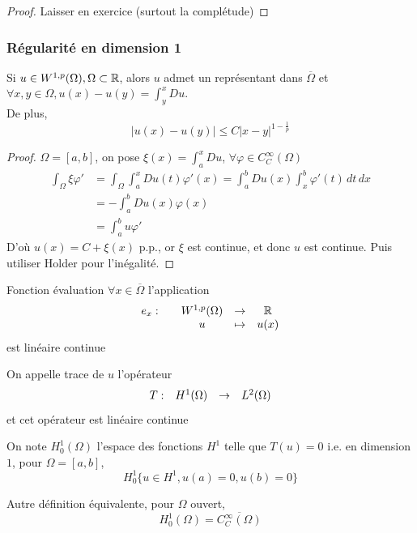 \documentclass[]{report}
\begin{document}
    \begin{proof}
        Laisser en exercice (surtout la complétude)
    \end{proof}

    \subsubsection*{Régularité en dimension 1}

    \begin{tm}{}{}
        Si $u\in W^{1,p}(\Omega),\Omega\subset \mathbb{R}$, alors $u$ admet un représentant dans $\overline{\Omega}$ et $\forall x,y\in \Omega,u(x)-u(y)=\int_y^x Du$.\\
        De plus, 
        \[\left|u(x)-u(y)\right|\le C\left|x-y\right|^{1-\frac{1}{p}}\]
    \end{tm}

    \begin{proof}
        $\Omega=[a,b]$, on pose $\xi(x)=\int_a^x Du$, $\forall \varphi\in C_C^\infty(\Omega)$
        \begin{align*}
            \int_\Omega \xi \varphi'&=\int_\Omega\int_a^x Du(t)\varphi'(x)=\int_a^b Du(x)\int_x^b\varphi'(t)\, dt\, dx\\
            &=-\int_a^b Du(x)\varphi(x)\\
            &=\int_a^b u\varphi'
        \end{align*}
        D'où $u(x)=C+\xi(x)$ p.p., or $\xi $ est continue, et donc $u$ est continue. Puis utiliser Holder pour l'inégalité.
    \end{proof}

    \begin{tm}{Fonction évaluation}{}
        $\forall x\in \overline{\Omega}$ l'application
        \[\begin{array}{ccccc} e_x : & & W^{1,p}(\Omega) & \to & \mathbb{R} \\ & & u & \mapsto & u(x) \end{array}\]
        est linéaire continue
    \end{tm}

    \begin{df}{}{}
        On appelle trace de $u$ l'opérateur
        \[\begin{array}{ccccc} T : & H^1(\Omega) & \to & L^2(\Omega) \end{array}\]
        et cet opérateur est linéaire continue
    \end{df}

    \begin{df}{}{}
        On note $H_0^1(\Omega)$ l'espace des fonctions $H^1$ telle que $T(u)=0$ i.e. en dimension $1$, pour $\Omega=[a,b]$,
        \[H_0^1\{u\in H^1,u(a)=0,u(b)=0\}\]
    \end{df}

    \begin{re}{}{}
        Autre définition équivalente, pour $\Omega$ ouvert,
        \[H_0^1(\Omega)=\overline{C_C^\infty(\Omega)}\]
    \end{re}
\end{document}
